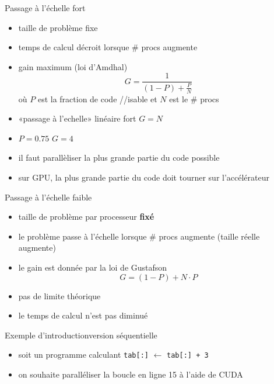 \documentclass[11pt,mathserif]{beamer}
\newcommand{\scout}{\faAngellist}
\newcommand{\gezi}{\faLongArrowRight}
\newcommand{\galde}{\faQuestion}
\newcommand{\hand}{\faHandORight}
\newcommand{\argi}{\faLightbulbO}
\newcommand{\kontuz}{\faExclamationTriangle}
\newcommand{\triste}{\faFrownO}
\newcommand{\egia}{\faCheckCircle}
\newcommand{\adibi}{\faCommentO}
\newcommand{\geziBikoitz}{\faArrowsH}
\newif\ifC
\newcommand{\mylang}{c}
\newcommand{\extlang}{c}
\newcommand{\mylang}{fortran}
\newcommand{\extlang}{f90}
\newcommand{\includeSrc}[1]{}
\begin{document}
 \lstset{numbers=left}
\begin{frame}{Passage à l'échelle fort}
\begin{itemize}[<+->]
  \item[\egia] taille de problème fixe
  \item[\scout] temps de calcul décroit lorsque \# procs augmente
  \item[\argi] gain maximum (loi d'Amdhal)
\begin{equation*}
G = \frac{1}{(1-P)+ \frac{P}{N}}
\end{equation*}
où $P$ est la fraction de code //isable et $N$ est le \# procs
 \item[\scout] «passage à l'echelle» linéaire fort \geziBikoitz  $G = N$
 \item[\adibi] $P = 0.75$ \gezi $G = 4$ \triste
 \item[\hand] il faut parallèliser la plus grande partie du code possible
 \item[\kontuz] sur GPU, la plus grande partie du code doit tourner sur l'accélérateur
\end{itemize}
\end{frame}

\begin{frame}{Passage à l'échelle faible}
\begin{itemize}[<+->]
  \item[\egia] taille de problème par processeur {\bf fixé}
  \item[\scout] le problème passe à l'échelle lorsque \# procs augmente (taille réelle augmente)
  \item[\argi] le gain est donnée par la loi de Gustafson
\begin{equation*}
G = (1-P) + N\cdot P
\end{equation*}
 \item[\scout] pas de limite théorique
 \item[\kontuz] le temps de calcul n'est pas diminué
\end{itemize}
\end{frame}

\begin{frame}{Exemple d'introduction}{version séquentielle}
\pause
\begin{itemize}[<+->]
  \item[\adibi] soit un programme calculant \texttt{tab[:]} $\leftarrow$ \texttt{tab[:] + 3}
  \includeSrc{code/increment}
   \item[\galde] on souhaite paralléliser la boucle en ligne \ifC 6 \else 15 \fi à l'aide de CUDA
\end{itemize}
\end{frame}
\end{document}
